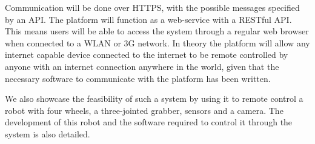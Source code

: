 Communication will be done over HTTPS, with the possible messages specified by an API.
The platform will function as a web-service with a RESTful API. %
This means users will be able to access the system through a regular web browser when connected to a WLAN or 3G network.
In theory the platform will allow any internet capable device connected to the internet to be remote controlled by anyone with an internet connection anywhere in the world, given that the necessary software to communicate with the platform has been written.

We also showcase the feasibility of such a system by using it to remote control a robot with four wheels, a three-jointed grabber, sensors and a camera.
The development of this robot and the software required to control it through the system is also detailed.
